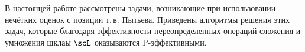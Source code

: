 
В настоящей работе рассмотрены задачи, возникающие при использовании нечётких оценок с позиции т.\,в. Пытьева. Приведены алгоритмы решения этих задач, которые благодаря эффективности переопределенных операций сложения и умножения шклаы $\scL$ оказываются P-эффективными.